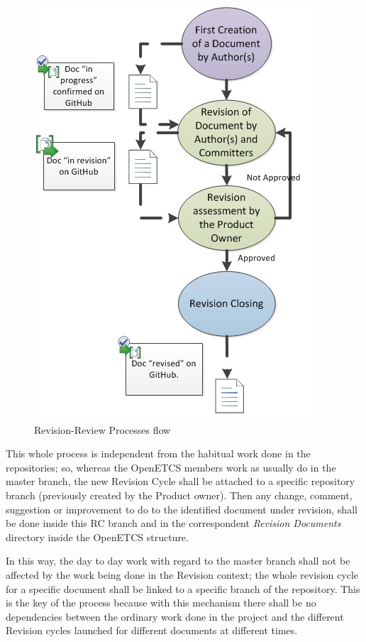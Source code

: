 \documentclass{template/openetcs_article}
\begin{document}
\begin{figure}[H]
\centering
\includegraphics{./figures/RevisionProcess.JPG}
\caption{Revision-Review Processes flow}
\end{figure}


This whole process is independent from the habitual work done in the repositories; so, whereas the OpenETCS members work as usually do in the master branch, the new Revision Cycle shall be attached to a specific repository branch (previously created by the Product owner). Then any change, comment, suggestion or improvement to do to the identified document under revision, shall be done inside this RC branch and in the correspondent {\it Revision Documents} directory inside the OpenETCS structure. 

In this way, the day to day work with regard to the master branch shall not be affected by the work being done in the Revision context; the whole revision cycle for a specific document shall be linked to a specific branch of the repository. 
This is the key of the process because with this mechanism there shall be no dependencies between the ordinary work done in the project and the different Revision cycles launched for different documents at different times.
\end{document}
